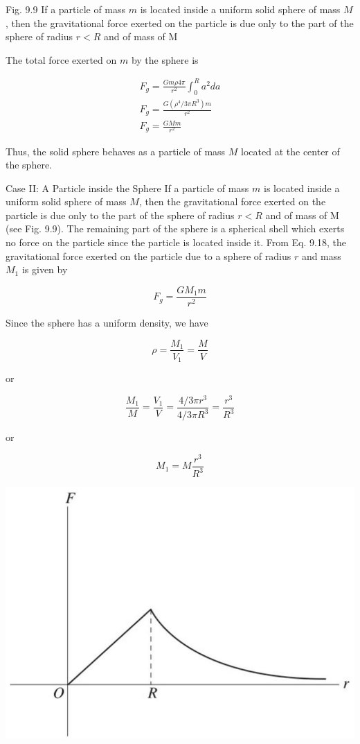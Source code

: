 \documentclass[10pt]{article}
\begin{document}
Fig. 9.9 If a particle of mass $m$ is located inside a uniform solid sphere of mass $M$, then the gravitational force exerted on the particle is due only to the part of the sphere of radius $r<R$ and of mass of M

The total force exerted on $m$ by the sphere is


\begin{gather*}
F_{g}=\frac{G m \rho 4 \pi}{r^{2}} \int_{0}^{R} a^{2} d a \\
F_{g}=\frac{G\left(\rho^{4} / 3 \pi R^{3}\right) m}{r^{2}} \\
F_{g}=\frac{G M m}{r^{2}} \tag{9.18}
\end{gather*}


Thus, the solid sphere behaves as a particle of mass $M$ located at the center of the sphere.

Case II: A Particle inside the Sphere If a particle of mass $m$ is located inside a uniform solid sphere of mass $M$, then the gravitational force exerted on the particle is due only to the part of the sphere of radius $r<R$ and of mass of M (see Fig. 9.9). The remaining part of the sphere is a spherical shell which exerts no force on the particle since the particle is located inside it. From Eq. 9.18, the gravitational force exerted on the particle due to a sphere of radius $r$ and mass $M_{1}$ is given by


\begin{equation*}
F_{g}=\frac{G M_{1} m}{r^{2}} \tag{9.19}
\end{equation*}


Since the sphere has a uniform density, we have

$$
\rho=\frac{M_{1}}{V_{1}}=\frac{M}{V}
$$

or

$$
\frac{M_{1}}{M}=\frac{V_{1}}{V}=\frac{4 / 3 \pi r^{3}}{4 / 3 \pi R^{3}}=\frac{r^{3}}{R^{3}}
$$

or


\begin{equation*}
M_{1}=M \frac{r^{3}}{R^{3}} \tag{9.20}
\end{equation*}


\begin{center}
\includegraphics[max width=\textwidth]{2024_09_13_db1f357d2aad0a03eb2eg-148(2)}
\end{center}
\end{document}
